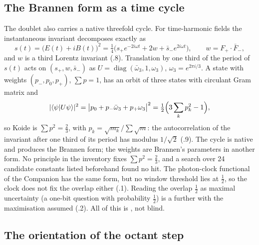 \subsection{The Brannen form as a time cycle}
\label{sec:B-time-cycle}

The doublet also carries a native threefold cycle. For time-harmonic fields the instantaneous invariant decomposes exactly as
\begin{equation}
 s(t)=\bigl(E(t)+iB(t)\bigr)^2=\tfrac14\bigl(s_+e^{-2i\omega t}+2w+\bar s_-e^{2i\omega t}\bigr),\qquad w=F_+\cdot\bar F_-,
 \label{eq:B-st}
\end{equation}
and $w$ is a third Lorentz invariant (.8). Translation by one third of the period of $s(t)$ acts on $(s_+,w,\bar s_-)$
as $U=\operatorname{diag}(\bar\omega_3,1,\omega_3)$, $\omega_3=e^{2\pi i/3}$. A state with weights $(p_-,p_0,p_+)$,
$\sum p=1$, has an orbit of three states with circulant Gram matrix and
\begin{equation}
 |\langle\psi|U\psi\rangle|^2=\bigl|p_0+p_-\bar\omega_3+p_+\omega_3\bigr|^2=\tfrac12\Bigl(3\sum_kp_k^2-1\Bigr),
 \label{eq:B-autocorr}
\end{equation}
so Koide is $\sum p^2=\tfrac23$, with $p_k=\sqrt{m_k}/\sum\sqrt m$: the autocorrelation of the invariant after one third of
its period has modulus $1/\sqrt2$ (.9). The cycle is native and produces the Brannen form; the weights are Brannen's
parameters in another form. No principle in the inventory fixes $\sum p^2=\tfrac23$, and a search over 24 candidate constants
listed beforehand found no hit. The photon-clock functional of the Companion has the same form, but no window threshold lies at
$\tfrac12$, so the clock does not fix the overlap either (.1). Reading the overlap $\tfrac12$ as maximal
uncertainty (a one-bit question with probability $\tfrac12$) is a further \Reading{} with the maximisation assumed
(.2). All of this is \Exploration, not blind.

\subsection{The orientation of the octant step}
\label{sec:B-koide-orientation}

